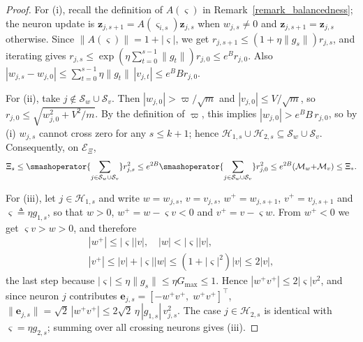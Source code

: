 \documentclass[letterpaper, 10 pt, conference]{ieeeconf}
\newcommand{\be}{\mathbf{e}}
\newcommand{\bz}{\mathbf{z}}
\newcommand{\cE}{\mathcal{E}}
\newcommand{\cM}{\mathcal{M}}
\newcommand{\cS}{\mathcal{S}}
\newcommand{\sH}{\mathscr{H}}
\newcommand{\Rem}{Remark}
\begin{document}
\begin{proof}
    For (i), recall the definition of $A(\varsigma)$ in \Rem~\ref{remark_balancedness}; the neuron update is $\bz_{j,s+1} = A(\varsigma_{i,s})\bz_{j,s}$ when $w_{j,s}\neq 0$ and $\bz_{j,s+1} = \bz_{j,s}$ otherwise. Since $\|A(\varsigma)\| = 1 + |\varsigma|$, we get $r_{j,s+1} \le ( 1 + \eta \|g_{s}\| ) r_{j,s}$, and iterating gives $r_{j,s} \le \exp( \eta \sum_{t=0}^{s-1} \|g_t\| )r_{j,0} \le e^{B} r_{j,0}$. Also $|w_{j,s} - w_{j,0}| \le \sum_{t=0}^{s-1} \eta \|g_t\|\, |v_{j,t}| \le e^{B} B r_{j,0}$.
 
    For (ii), take $j \notin \cS_{w} \cup \cS_{v}$. Then $|w_{j,0}| > \varpi / \sqrt{m}$ and $|v_{j,0}| \le V / \sqrt{m}$, so $r_{j,0} \le \sqrt{w_{j,0}^{2} + {V^{2}}/{m}}$. By the definition of $\varpi$, this implies $|w_{j,0}| > e^{B} B\, r_{j,0}$, so by (i) $w_{j,s}$ cannot cross zero for any $s\le k+1$; hence $\sH_{1,s} \cup \sH_{2,s} \subseteq \cS_{w} \cup \cS_{v}$. Consequently, on $\cE_{\Xi}$,
    \begin{equation}
        \Xi_{s} \le \smashoperator{\sum_{j \in \cS_{w} \cup \cS_{v}}} r_{j,s}^{2}
                \le e^{2B} \smashoperator{\sum_{j \in \cS_{w} \cup \cS_{v}}} r_{j,0}^{2}
                \le e^{2B} (\cM_{w} {+} \cM_{v})
                \le \Xi_{\ast}.
    \end{equation}
 
    For (iii), let $j \in \sH_{1,s}$ and write $w {=} w_{j,s}$, $v {=} v_{j,s}$, $w^{+} {=} w_{j,s+1}$, $v^{+} {=} v_{j,s+1}$ and $\varsigma \triangleq \eta g_{1,s}$, so that $w>0$, $w^{+} = w - \varsigma v < 0$ and $v^{+} = v - \varsigma w$. From $w^{+}<0$ we get $\varsigma v > w > 0$, and therefore
    \begin{equation}
        \begin{gathered}
        |w^{+}| {\le} |\varsigma||v|,
        \quad
        |w| {<} |\varsigma||v|, \\
        |v^{+}| {\le} |v| {+} |\varsigma||w| {\le} (1{+}|\varsigma|^{2})|v| {\le} 2|v|,
        \end{gathered}
    \end{equation}
    the last step because $|\varsigma| \le \eta \|g_{s}\| \le \eta G_{\max} \le 1$. Hence $|w^{+}v^{+}| \le 2|\varsigma| v^{2}$, and since neuron $j$ contributes $\be_{j,s} = [-w^{+}v^{+},\; w^{+}v^{+}]^{\top}$, $
        \|\be_{j,s}\| = \sqrt{2}\,|w^{+}v^{+}| \le 2\sqrt{2}\,\eta\,|g_{1,s}|\,v_{j,s}^{2}$.
    The case $j\in \sH_{2,s}$ is identical with $\varsigma = \eta g_{2,s}$; summing over all crossing neurons gives (iii).
\end{proof}
\end{document}
